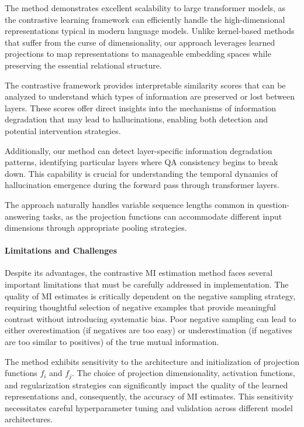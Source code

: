 The method demonstrates excellent scalability to large transformer models, as the contrastive learning framework can efficiently handle the high-dimensional representations typical in modern language models. Unlike kernel-based methods that suffer from the curse of dimensionality, our approach leverages learned projections to map representations to manageable embedding spaces while preserving the essential relational structure.

The contrastive framework provides interpretable similarity scores that can be analyzed to understand which types of information are preserved or lost between layers. These scores offer direct insights into the mechanisms of information degradation that may lead to hallucinations, enabling both detection and potential intervention strategies.

Additionally, our method can detect layer-specific information degradation patterns, identifying particular layers where QA consistency begins to break down. This capability is crucial for understanding the temporal dynamics of hallucination emergence during the forward pass through transformer layers.

The approach naturally handles variable sequence lengths common in question-answering tasks, as the projection functions can accommodate different input dimensions through appropriate pooling strategies.

\paragraph{Limitations and Challenges}

Despite its advantages, the contrastive MI estimation method faces several important limitations that must be carefully addressed in implementation. The quality of MI estimates is critically dependent on the negative sampling strategy, requiring thoughtful selection of negative examples that provide meaningful contrast without introducing systematic bias. Poor negative sampling can lead to either overestimation (if negatives are too easy) or underestimation (if negatives are too similar to positives) of the true mutual information.

The method exhibits sensitivity to the architecture and initialization of projection functions $f_i$ and $f_j$. The choice of projection dimensionality, activation functions, and regularization strategies can significantly impact the quality of the learned representations and, consequently, the accuracy of MI estimates. This sensitivity necessitates careful hyperparameter tuning and validation across different model architectures.

